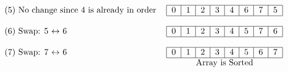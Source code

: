 \documentclass{article}
\begin{document}
\begin{align}
\begin{tabular}{l c}
        \text{(5) No change since 4 is already in order}&\begin{tabular}{|c|c|c|c|c|c|c|c|}
            \hline
        0&1&2&3&4&6&7&5\\
            \hline
        \end{tabular}\\&\\
        \text{(6)  Swap: 5 $\leftrightarrow$ 6}&\begin{tabular}{|c|c|c|c|c|c|c|c|}
            \hline
        0&1&2&3&4&5&7&6\\
            \hline
        \end{tabular}\\&\\
        \text{(7)  Swap: 7 $\leftrightarrow$ 6}&\begin{tabular}{|c|c|c|c|c|c|c|c|}
            \hline
        0&1&2&3&4&5&6&7\\
            \hline
        \end{tabular}\\
        &\text{Array is Sorted}
    \end{tabular}
\end{align}
\end{document}
